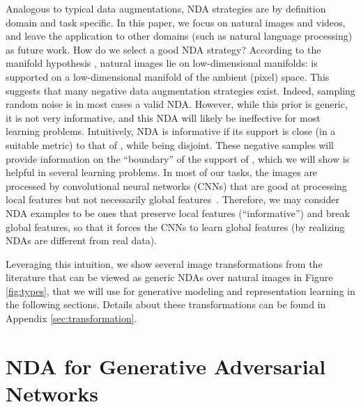 \documentclass{article} \usepackage{iclr2021_conference,times}
\begin{document}
 Analogous to typical data augmentations, NDA strategies are by definition domain and task specific. 
 In this paper, we focus on natural images and videos, and
leave the application to other domains (such as natural language processing) 
as future work.
How do we select a good NDA strategy?
According to the manifold hypothesis \citep{fefferman2016testing}, natural images lie on low-dimensional manifolds:  is supported on a low-dimensional manifold of the ambient (pixel) space. This suggests that many negative data augmentation strategies exist. Indeed, sampling random noise is in most cases a valid NDA. However, while this prior is  generic, it is not very informative, and this NDA will likely be ineffective for most learning problems. Intuitively, NDA is informative if its support is close (in a suitable metric) to that of , while being disjoint. These negative samples will provide information on the ``boundary'' of the support of ,
which we will show is helpful in several learning problems. 
In most of our tasks, the images are processed by convolutional neural networks (CNNs) that are good at processing local features but not necessarily global features~\citep{geirhos2018imagenet}. Therefore, we may consider NDA examples to be ones that preserve local features (``informative'') and break global features, so that it forces the CNNs to learn global features (by realizing NDAs are different from real data).




Leveraging this intuition, we show several image transformations from the literature that can be viewed as generic NDAs over natural images in Figure \ref{fig:types}, that we will use for generative modeling and representation learning in the following sections. Details about these transformations can be found in Appendix \ref{sec:transformation}.
































 

\section{NDA for Generative Adversarial Networks}
\end{document}
